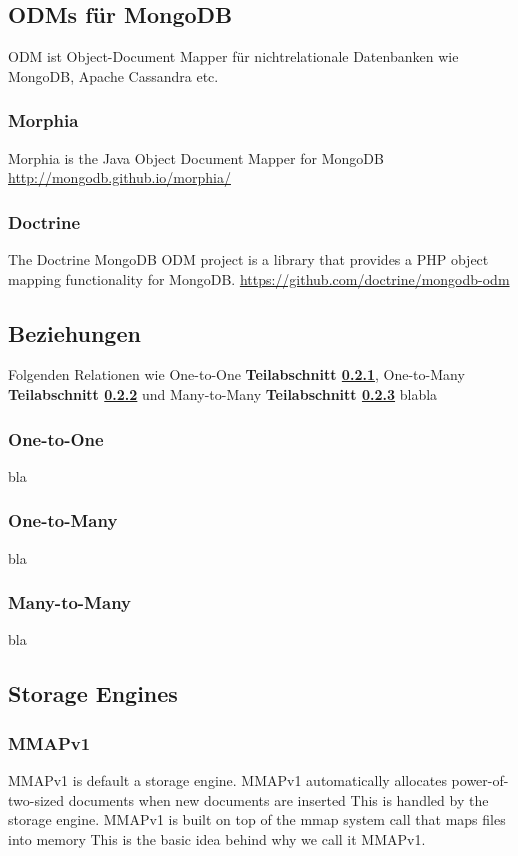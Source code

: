 \subsection{ODMs für MongoDB}

ODM ist Object-Document Mapper für nichtrelationale Datenbanken wie MongoDB, Apache Cassandra etc.

\subsubsection{Morphia}
Morphia is the Java Object Document Mapper for MongoDB \url{http://mongodb.github.io/morphia/}

\subsubsection{Doctrine}
The Doctrine MongoDB ODM project is a library that provides a PHP object mapping functionality for MongoDB. \url{https://github.com/doctrine/mongodb-odm}

\subsection{Beziehungen}
Folgenden Relationen wie One-to-One \textbf{Teilabschnitt \ref{1:1}}, One-to-Many \textbf{Teilabschnitt \ref{1:n}} und Many-to-Many \textbf{Teilabschnitt \ref{n:m}} blabla

\subsubsection{One-to-One}\label{1:1}
bla

\subsubsection{One-to-Many}\label{1:n}
bla

\subsubsection{Many-to-Many}\label{n:m}
bla

\subsection{Storage Engines}

\subsubsection{MMAPv1}
MMAPv1 is default a storage engine.
MMAPv1 automatically allocates power-of-two-sized documents when new documents are inserted
This is handled by the storage engine.
MMAPv1 is built on top of the mmap system call that maps files into memory
This is the basic idea behind why we call it MMAPv1.

